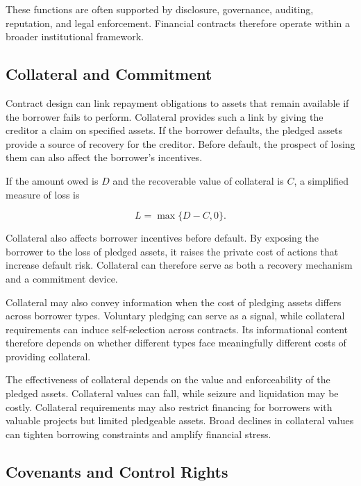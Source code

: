 These functions are often supported by disclosure, governance, auditing, reputation, and legal enforcement. Financial contracts therefore operate within a broader institutional framework.

\subsection{Collateral and Commitment}

Contract design can link repayment obligations to assets that remain available if the borrower fails to perform. Collateral provides such a link by giving the creditor a claim on specified assets. If the borrower defaults, the pledged assets provide a source of recovery for the creditor. Before default, the prospect of losing them can also affect the borrower's incentives.

If the amount owed is $D$  and the recoverable value of collateral is $C$, a simplified measure of loss is

\begin{equation}
L=\max\{D-C,0\}.
\label{eq:ch3-collateral-loss}
\end{equation}

Collateral also affects borrower incentives before default. By exposing the borrower to the loss of pledged assets, it raises the private cost of actions that increase default risk. Collateral can therefore serve as both a recovery mechanism and a commitment device.

Collateral may also convey information when the cost of pledging assets differs across borrower types. Voluntary pledging can serve as a signal, while collateral requirements can induce self-selection across contracts. Its informational content therefore depends on whether different types face meaningfully different costs of providing collateral.

The effectiveness of collateral depends on the value and enforceability of the pledged assets. Collateral values can fall, while seizure and liquidation may be costly. Collateral requirements may also restrict financing for borrowers with valuable projects but limited pledgeable assets. Broad declines in collateral values can tighten borrowing constraints and amplify financial stress.

\subsection{Covenants and Control Rights}

